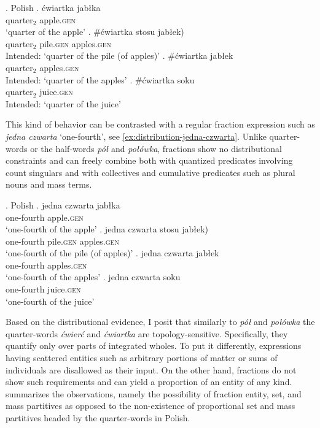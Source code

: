 \ex.\label{ex:distribution-cwiartka} Polish
        \ag. ćwiartka jabłka\label{ex:distribution-cwiartka-sg}\\
		quarter$_2$ apple\textsc{.gen}\\
		`quarter of the apple'
		\bg. \#ćwiartka  stosu \minsp{(} jabłek)\label{ex:distribution-cwiartka-group}\\
		quarter$_2$ pile\textsc{.gen} {} apples\textsc{.gen}\\
		Intended: `quarter of the pile (of apples)'
		\bg. \#ćwiartka jabłek\label{ex:distribution-cwiartka-pl}\\
		quarter$_2$ apples\textsc{.gen}\\
		Intended: `quarter of the apples'
		\bg. \#ćwiartka soku\label{ex:distribution-cwiartka-mass}\\
		quarter$_2$ juice\textsc{.gen}\\
		Intended: `quarter of the juice'

This kind of behavior can be contrasted with a regular fraction expression such as \textit{jedna czwarta} `one-fourth', see \ref{ex:distribution-jedna-czwarta}. Unlike quarter-words or the half-words \textit{pół} and \textit{połówka}, fractions show no distributional constraints and can freely combine both with quantized predicates involving count singulars and with collectives and cumulative predicates such as plural nouns and mass terms.

\ex.\label{ex:distribution-jedna-czwarta} Polish
        \ag. {jedna czwarta} jabłka\label{ex:distribution-jedna-czwarta-sg}\\
		one-fourth apple\textsc{.gen}\\
		`one-fourth of the apple'
		\bg. {jedna czwarta}  stosu \minsp{(} jabłek)\label{ex:distribution-jedna-czwarta-group}\\
		one-fourth pile\textsc{.gen} {} apples\textsc{.gen}\\
		`one-fourth of the pile (of apples)'
		\bg. {jedna czwarta} jabłek\label{ex:distribution-jedna-czwarta-pl}\\
		one-fourth apples\textsc{.gen}\\
		`one-fourth of the apples'
		\bg. {jedna czwarta} soku\label{ex:distribution-jedna-czwarta-mass}\\
		one-fourth juice\textsc{.gen}\\
		`one-fourth of the juice'

Based on the distributional evidence, I posit that similarly to \textit{pół} and \textit{połówka} the quarter-words \textit{ćwierć} and \textit{ćwiartka} are topology-sensitive. Specifically, they quantify only over parts of integrated wholes. To put it differently, expressions having scattered entities such as arbitrary portions of matter or sums of individuals are disallowed as their input. On the other hand, fractions do not show such requirements and can yield a proportion of an entity of any kind.  summarizes the observations, namely the possibility of fraction entity, set, and mass partitives as opposed to the non-existence of proportional set and mass partitives headed by the quarter-words in Polish.

